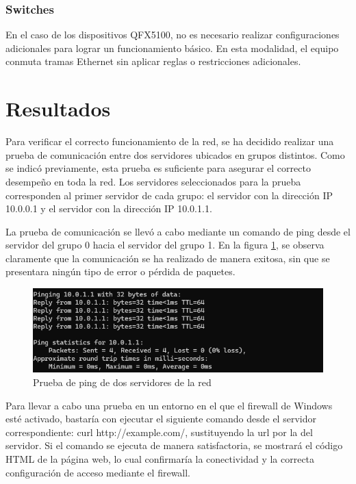 \documentclass[%
    school=etsisi,%
    degree=61TI,%
]{upm-report}
\begin{document}
\subsubsection{Switches}

En el caso de los dispositivos QFX5100, no es necesario realizar configuraciones adicionales para lograr un funcionamiento básico. En esta modalidad, el equipo conmuta tramas Ethernet sin aplicar reglas o restricciones adicionales.

\section{Resultados}

Para verificar el correcto funcionamiento de la red, se ha decidido realizar una prueba de comunicación entre dos servidores ubicados en grupos distintos. Como se indicó previamente, esta prueba es suficiente para asegurar el correcto desempeño en toda la red. Los servidores seleccionados para la prueba corresponden al primer servidor de cada grupo: el servidor con la dirección IP 10.0.0.1 y el servidor con la dirección IP 10.0.1.1.

La prueba de comunicación se llevó a cabo mediante un comando de ping desde el servidor del grupo 0 hacia el servidor del grupo 1. En la figura \ref{fig:ping-test}, se observa claramente que la comunicación se ha realizado de manera exitosa, sin que se presentara ningún tipo de error o pérdida de paquetes.

\begin{figure}
    \centering
    \includegraphics[width=1.0\textwidth]{figures/ping-test.png}
    \caption{\label{fig:ping-test} Prueba de ping de dos servidores de la red}
\end{figure}

Para llevar a cabo una prueba en un entorno en el que el firewall de Windows esté activado, bastaría con ejecutar el siguiente comando desde el servidor correspondiente: curl http://example.com/, sustituyendo la url por la del servidor. Si el comando se ejecuta de manera satisfactoria, se mostrará el código HTML de la página web, lo cual confirmaría la conectividad y la correcta configuración de acceso mediante el firewall.
\end{document}
